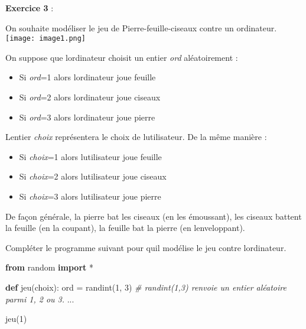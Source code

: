 \documentclass[
  paper=a4,
  ,captions=tableheading
]{scrartcl}
\newenvironment{Shaded}{}{}
\newcommand{\BuiltInTok}[1]{\textcolor[rgb]{0.00,0.50,0.00}{#1}}
\newcommand{\CommentTok}[1]{\textcolor[rgb]{0.38,0.63,0.69}{\textit{#1}}}
\newcommand{\DecValTok}[1]{\textcolor[rgb]{0.25,0.63,0.44}{#1}}
\newcommand{\ImportTok}[1]{\textcolor[rgb]{0.00,0.50,0.00}{\textbf{#1}}}
\newcommand{\KeywordTok}[1]{\textcolor[rgb]{0.00,0.44,0.13}{\textbf{#1}}}
\newcommand{\NormalTok}[1]{#1}
\newcommand{\OperatorTok}[1]{\textcolor[rgb]{0.40,0.40,0.40}{#1}}
\providecommand{\tightlist}{%
  \setlength{\itemsep}{0pt}\setlength{\parskip}{0pt}}
\begin{document}
\textbf{Exercice 3} :

On souhaite modéliser le jeu de Pierre-feuille-ciseaux contre un
ordinateur. \texttt{[image: image1.png]}

On suppose que l\textquotesingle ordinateur choisit un entier \emph{ord}
aléatoirement :

\begin{itemize}
\tightlist
\item
  Si \emph{ord}=1 alors l\textquotesingle ordinateur joue feuille
\item
  Si \emph{ord}=2 alors l\textquotesingle ordinateur joue ciseaux
\item
  Si \emph{ord}=3 alors l\textquotesingle ordinateur joue pierre
\end{itemize}

L\textquotesingle entier \emph{choix} représentera le choix de
l\textquotesingle utilisateur. De la même manière :

\begin{itemize}
\tightlist
\item
  Si \emph{choix}=1 alors l\textquotesingle utilisateur joue feuille
\item
  Si \emph{choix}=2 alors l\textquotesingle utilisateur joue ciseaux
\item
  Si \emph{choix}=3 alors l\textquotesingle utilisateur joue pierre
\end{itemize}

De façon générale, la pierre bat les ciseaux (en les émoussant), les
ciseaux battent la feuille (en la coupant), la feuille bat la pierre (en
l\textquotesingle enveloppant).

Compléter le programme suivant pour qu\textquotesingle il modélise le
jeu contre l\textquotesingle ordinateur.

\begin{Shaded}
\begin{Highlighting}[]
\ImportTok{from}\NormalTok{ random }\ImportTok{import} \OperatorTok{*}


\KeywordTok{def}\NormalTok{ jeu(choix):}
    \BuiltInTok{ord} \OperatorTok{=}\NormalTok{ randint(}\DecValTok{1}\NormalTok{, }\DecValTok{3}\NormalTok{)  }\CommentTok{\# randint(1,3) renvoie un entier aléatoire parmi 1, 2 ou 3.}
\NormalTok{    ...}


\NormalTok{jeu(}\DecValTok{1}\NormalTok{)}
\end{Highlighting}
\end{Shaded}
\end{document}
